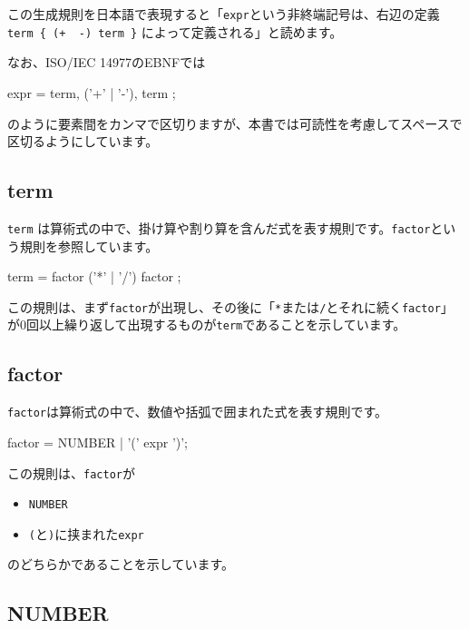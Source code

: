 この生成規則を日本語で表現すると「\texttt{expr}という非終端記号は、右辺の定義
\texttt{term\ \{\ (\textquotesingle{}+\textquotesingle{}\ \textbar{}\ \textquotesingle{}-\textquotesingle{})\ term\ \}}
によって定義される」と読めます。

なお、ISO/IEC 14977のEBNFでは

\begin{codescreen}{}
expr = term, { ('+' | '-'), term };
\end{codescreen}

\noindent のように要素間をカンマで区切りますが、本書では可読性を考慮してスペースで区切るようにしています。

\subsection{term}

\texttt{term}
は算術式の中で、掛け算や割り算を含んだ式を表す規則です。\texttt{factor}という規則を参照しています。

\begin{codescreen}{}
term = factor { ('*' | '/') factor };
\end{codescreen}

この規則は、まず\texttt{factor}が出現し、その後に「\texttt{*}または\texttt{/}とそれに続く\texttt{factor}」が0回以上繰り返して出現するものが\texttt{term}であることを示しています。

\subsection{factor}

\texttt{factor}は算術式の中で、数値や括弧で囲まれた式を表す規則です。

\begin{codescreen}{}
factor = NUMBER | '(' expr ')';
\end{codescreen}

この規則は、\texttt{factor}が

\begin{itemize}
\item
  \texttt{NUMBER}
\item
  \texttt{(}と\texttt{)}に挟まれた\texttt{expr}
\end{itemize}

\noindent のどちらかであることを示しています。

\subsection{NUMBER}

